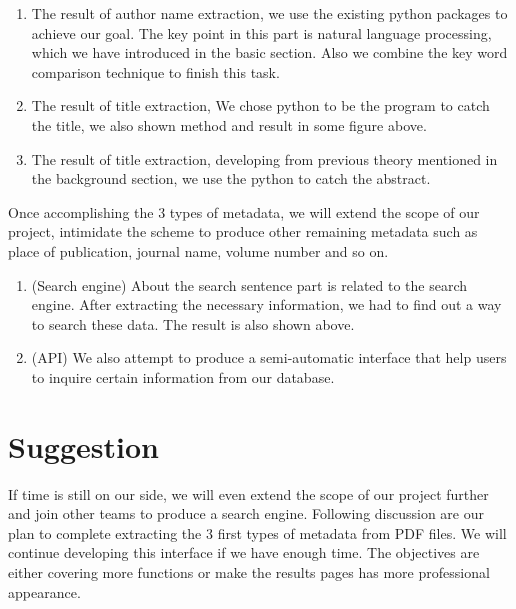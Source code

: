 		\begin{enumerate}
			\item The result of author name extraction, we use the existing python packages to achieve our goal.
			The key point in this part is natural language processing, which we have introduced in the basic section. 
			Also we combine the key word comparison technique to finish this task.
			\item The result of title extraction, We chose python to be the program to catch the title, we also shown method and result in some figure above.
			\item The result of title extraction, developing from previous theory mentioned in the background section, 
			we use the python to catch the abstract.
		\end{enumerate}	
Once accomplishing the 3 types of metadata, we will extend the scope of our project, intimidate the scheme to produce other remaining metadata such as place of publication, journal name, volume number and so on. 
		\begin{enumerate}
			\item (Search engine) About the search sentence part is related to the search engine. After extracting the necessary information, we had to find out a way to search these data. The result is also shown above.
			\item (API) We also attempt to produce a semi-automatic interface that help users to inquire certain information from our database.
		\end{enumerate}	

\section*{Suggestion}
If time is still on our side, we will even extend the scope of our project further and join other teams to produce a search engine. 
Following discussion are our plan to complete extracting the 3 first types of metadata from PDF files.
We will continue developing this interface if we have enough time. 
The objectives are either covering more functions or make the results pages has more professional appearance.
 
\newpage %